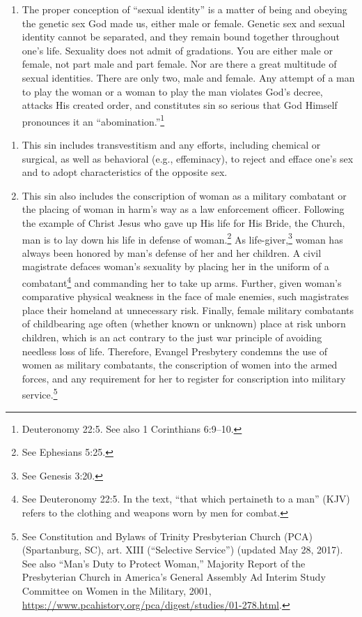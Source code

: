 \documentclass[
]{book}
\providecommand{\tightlist}{%
  \setlength{\itemsep}{0pt}\setlength{\parskip}{0pt}}
\begin{document}
\begin{enumerate}
\def\labelenumi{\arabic{enumi}.}
\setcounter{enumi}{6}
\tightlist
\item
  \protect\hypertarget{28.7}{\href{}{}}The proper conception of ``sexual identity'' is a matter of being and obeying the genetic sex God made us, either male or female. Genetic sex and sexual identity cannot be separated, and they remain bound together throughout one's life. Sexuality does not admit of gradations. You are either male or female, not part male and part female. Nor are there a great multitude of sexual identities. There are only two, male and female. Any attempt of a man to play the woman or a woman to play the man violates God's decree, attacks His created order, and constitutes sin so serious that God Himself pronounces it an ``abomination.''\footnote{Deuteronomy 22:5. See also 1 Corinthians 6:9--10.}
\end{enumerate}

\begin{enumerate}
\def\labelenumi{\arabic{enumi}.}
\setcounter{enumi}{7}
\tightlist
\item
  This sin includes transvestitism and any efforts, including chemical or surgical, as well as behavioral (e.g., effeminacy), to reject and efface one's sex and to adopt characteristics of the opposite sex.
\item
  This sin also includes the conscription of woman as a military combatant or the placing of woman in harm's way as a law enforcement officer. Following the example of Christ Jesus who gave up His life for His Bride, the Church, man is to lay down his life in defense of woman.\footnote{See Ephesians 5:25.} As life-giver,\footnote{See Genesis 3:20.} woman has always been honored by man's defense of her and her children. A civil magistrate defaces woman's sexuality by placing her in the uniform of a combatant\footnote{See Deuteronomy 22:5. In the text, ``that which pertaineth to a man'' (KJV) refers to the clothing and weapons worn by men for combat.} and commanding her to take up arms. Further, given woman's comparative physical weakness in the face of male enemies, such magistrates place their homeland at unnecessary risk. Finally, female military combatants of childbearing age often (whether known or unknown) place at risk unborn children, which is an act contrary to the just war principle of avoiding needless loss of life. Therefore, Evangel Presbytery condemns the use of women as military combatants, the conscription of women into the armed forces, and any requirement for her to register for conscription into military service.\footnote{See Constitution and Bylaws of Trinity Presbyterian Church (PCA) (Spartanburg, SC), art. XIII (``Selective Service'') (updated May 28, 2017). See also ``Man's Duty to Protect Woman,'' Majority Report of the Presbyterian Church in America's General Assembly Ad Interim Study Committee on Women in the Military, 2001, \url{https://www.pcahistory.org/pca/digest/studies/01-278.html}.}
\end{enumerate}
\end{document}
